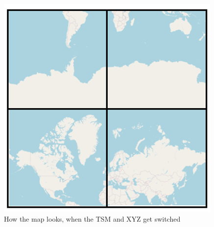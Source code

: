 \begin{figure} [H]
	\centering
	\includegraphics[width=.8\textwidth]{Pictures/SlippyInTMS}
	\caption{How the map looks, when the TSM and XYZ get switched}
	\label{SlippyInTMS}
\end{figure}